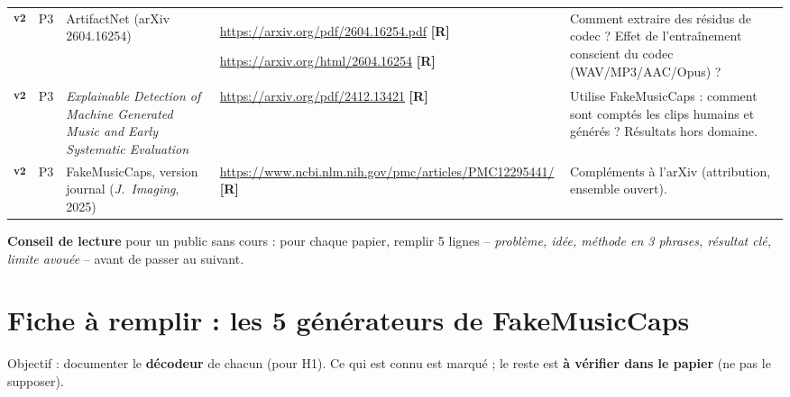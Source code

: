 \documentclass[11pt,a4paper]{article}
\newcommand{\vtwo}{\textsuperscript{\textcolor{orange!80!black}{\textbf{v2}}}}
\newcommand{\lR}{\textbf{\textcolor{orange!80!black}{[R]}}}
\begin{document}
{\begin{longtable}{L{0.6cm}L{0.9cm}L{3.9cm}L{4.5cm}L{5.0cm}}
\vtwo & P3 & ArtifactNet (arXiv 2604.16254) & \url{https://arxiv.org/pdf/2604.16254.pdf} \lR\par \url{https://arxiv.org/html/2604.16254} \lR & Comment extraire des résidus de codec ? Effet de l'entraînement conscient du codec (WAV/MP3/AAC/Opus) ?\\
\vtwo & P3 & \emph{Explainable Detection of Machine Generated Music and Early Systematic Evaluation} & \url{https://arxiv.org/pdf/2412.13421} \lR & Utilise FakeMusicCaps : comment sont comptés les clips humains et générés ? Résultats hors domaine.\\
\vtwo & P3 & FakeMusicCaps, version journal (\emph{J.\ Imaging}, 2025) & \url{https://www.ncbi.nlm.nih.gov/pmc/articles/PMC12295441/} \lR & Compléments à l'arXiv (attribution, ensemble ouvert).\\
\end{longtable}}

\textbf{Conseil de lecture} pour un public sans cours : pour chaque papier, remplir 5 lignes -- \emph{problème, idée, méthode en 3 phrases, résultat clé, limite avouée} -- avant de passer au suivant.

\section{Fiche à remplir : les 5 générateurs de FakeMusicCaps}\label{sec:generateurs}

Objectif : documenter le \textbf{décodeur} de chacun (pour H1). Ce qui est connu est marqué ; le reste est \textbf{à vérifier dans le papier} (ne pas le supposer).
\end{document}

